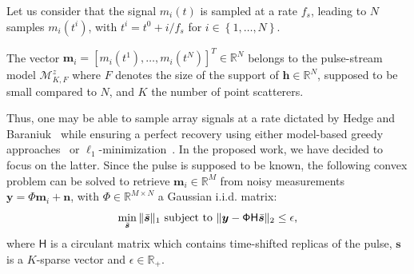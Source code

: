 \documentclass{article}
\newcommand{\vect}[1]{\bm{#1}}
\newcommand{\mat}[1]{\mathsf{#1}}
\newcommand{\ser}[2]{#1^{#2}}
\theoremstyle{definition}
\begin{document}
Let us consider that the signal $m_i \left(t\right)$ is sampled at a rate $f_s$, leading to $N$ samples $ m_i \left(\ser{t}{i}\right)$, with $\ser{t}{i}= \ser{t}{0} + i/f_s$ for $i \in \left\lbrace 1,\dots,N \right\rbrace$.

The vector $\vect{m}_i = \left[m_i\left(\ser{t}{1}\right),\dots,m_i\left(\ser{t}{N}\right)\right]^T \in \mathbb{R}^N$ belongs to the pulse-stream model $\mathcal{M}^z_{K,F}$ where $F$ denotes the size of the support of $\vect{h} \in \mathbb{R}^N$, supposed to be small compared to $N$, and $K$ the number of point scatterers.

Thus, one may be able to sample array signals at a rate dictated by Hedge and Baraniuk~\cite{Hedge_TSP_2011} while ensuring a perfect recovery using either model-based greedy approaches~\cite{Baraniuk2010} or $\ell_1$-minimization~\cite{candes11}. 
In the proposed work, we have decided to focus on the latter. Since the pulse is supposed to be known, the following convex problem can be solved to retrieve $\vect{m}_i \in \mathbb{R}^M$ from noisy measurements $\vect{y} = \mathsf{\Phi} \vect{m}_i + \vect{n}$, with $\mathsf{\Phi} \in \mathbb{R}^{M \times N}$ a Gaussian i.i.d. matrix:
\begin{equation}
\label{eq_l1_BPDN}
\min_{\bar{\vect{s}}}\|\bar{\vect{s}}\|_{1}
\textnormal{ subject to }\| \bm{y}-\mat{\Phi H}\bar{\vect{s}}\|_{2}\leq\epsilon,
\end{equation}
where $\mat{H}$ is a circulant matrix which contains time-shifted replicas of the pulse, $\vect{s}$ is a $K$-sparse vector and $\epsilon \in \mathbb{R}_{+}$.
\end{document}
